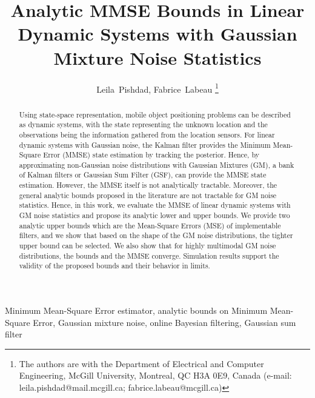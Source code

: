 \documentclass[10pt,twocolumn,twoside]{IEEEtran}
\newcommand{\corcol}[1]{\textcolor{CorCol}{#1}}
\begin{document}
\allowdisplaybreaks

\title{Analytic MMSE Bounds in Linear Dynamic Systems with Gaussian Mixture Noise Statistics}

\author{Leila~Pishdad,
Fabrice~Labeau
\thanks{The authors are with the Department of Electrical and Computer Engineering, McGill University, Montreal, QC H3A 0E9, Canada (e-mail: leila.pishdad@mail.mcgill.ca; fabrice.labeau@mcgill.ca)}
}















\maketitle

\begin{abstract}
Using state-space representation, mobile object positioning problems can be described as dynamic systems, with the state representing the unknown location and the observations being the information gathered from the location sensors. For linear dynamic systems with Gaussian noise, \corcol{the} Kalman filter provides the Minimum Mean-Square Error (MMSE) state estimation by tracking the posterior. Hence, by approximating non-Gaussian noise distributions with Gaussian Mixtures (GM), a bank of Kalman filters or Gaussian Sum Filter (GSF), can provide the MMSE state estimation. However, the MMSE itself is not analytically tractable. Moreover, the general analytic bounds proposed in the literature are not tractable for GM noise statistics. Hence, in this work, we evaluate the MMSE of linear dynamic systems with GM noise statistics and propose its analytic lower and upper bounds. We provide two analytic upper bounds which are the Mean-Square Errors (MSE) of implementable filters, and we show that based on the shape of the GM noise distributions, the tighter upper bound can be selected. We also show that for highly multimodal GM noise distributions, the bounds and the MMSE converge. Simulation results support the validity of the proposed bounds and their behavior in limits.  \end{abstract}
\begin{IEEEkeywords}
Minimum Mean-Square Error estimator, analytic bounds on Minimum Mean-Square Error, Gaussian mixture noise, online Bayesian filtering, Gaussian sum filter
\end{IEEEkeywords}
\end{document}
